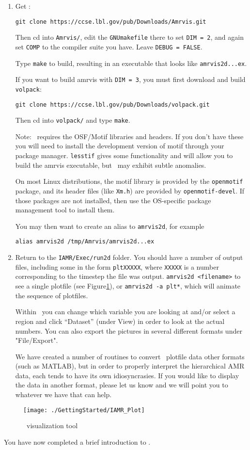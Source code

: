 \begin{enumerate}

\item Get \amrvis:
\begin{verbatim}
git clone https://ccse.lbl.gov/pub/Downloads/Amrvis.git
\end{verbatim}

Then cd into {\tt Amrvis/}, edit the {\tt GNUmakefile} there
to set {\tt DIM = 2}, and again set {\tt COMP} to the compiler
suite you have. Leave {\tt DEBUG = FALSE}.

Type {\tt make} to build, resulting in an executable that
looks like {\tt amrvis2d...ex}.

If you want to build amrvis with {\tt DIM = 3}, you must first
download and build {\tt volpack}:
\begin{verbatim}
git clone https://ccse.lbl.gov/pub/Downloads/volpack.git
\end{verbatim}

Then cd into {\tt volpack/} and type {\tt make}.

Note: \amrvis\ requires the OSF/Motif libraries and headers. If you don't have these 
you will need to install the development version of motif through your package manager. 
{\tt lesstif} gives some functionality and will allow you to build the amrvis executable, 
but \amrvis\ may exhibit subtle anomalies.

On most Linux distributions, the motif library is provided by the
{\tt openmotif} package, and its header files (like {\tt Xm.h}) are provided
by {\tt openmotif-devel}. If those packages are not installed, then use the
OS-specific package management tool to install them. 

You may then want to create an alias to {\tt amrvis2d}, for example
\begin{verbatim}
alias amrvis2d /tmp/Amrvis/amrvis2d...ex
\end{verbatim}

\item Return to the {\tt IAMR/Exec/run2d} folder.  You should
  have a number of output files, including some in the form {\tt *pltXXXXX},
  where {\tt XXXXX} is a number corresponding to the timestep the file
  was output.  {\tt amrvis2d <filename>} to see a single plotfile
  (see Figure\ref{Fig:Amrvis}), 
   or {\tt amrvis2d -a plt*}, which will animate the sequence of plotfiles.

  Within \amrvis\ you can change which variable you are
  looking at and/or select a region and click ``Dataset'' (under View)
  in order to look at the actual numbers. You can also export the
  pictures in several different formats under "File/Export".

  We have created a number of routines to convert \amrex\ plotfile data
  other formats (such as MATLAB), but in order to properly interpret 
  the hierarchical AMR data, each tends to have its own idiosyncrasies.
  If you would like to display the data in another format, please let us know
  and we will point you to whatever we have that can help.

\end{enumerate}

\begin{figure}[tb]
\centering
\texttt{[image: ./GettingStarted/IAMR\_Plot]}
\caption{\amrvis\ visualization tool}
\label{Fig:Amrvis}
\end{figure}

You have now completed a brief introduction to \iamr. 
